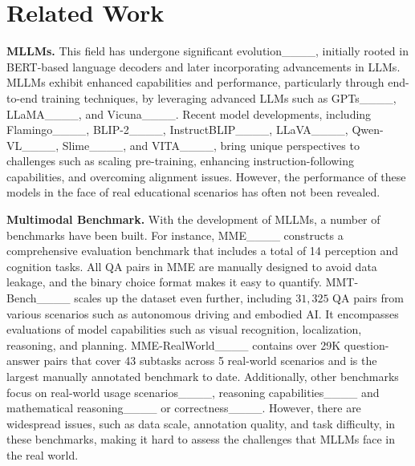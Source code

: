 \section{Related Work}
\textbf{MLLMs.} 
This field has undergone significant evolution____, initially rooted in BERT-based language decoders and later incorporating advancements in LLMs. 
MLLMs exhibit enhanced capabilities and performance, particularly through end-to-end training techniques, by leveraging advanced LLMs such as GPTs____,
LLaMA____,  and Vicuna____. Recent model developments, including Flamingo____, BLIP-2____, InstructBLIP____, LLaVA____, Qwen-VL____, Slime____, and VITA____, bring unique perspectives to challenges such as scaling pre-training, enhancing instruction-following capabilities, and overcoming alignment issues. 
However, the performance of these models in the face of real educational scenarios has often not been revealed.

\textbf{Multimodal Benchmark.} 
With the development of MLLMs, a number of benchmarks have been built.
For instance, MME____ constructs a comprehensive evaluation benchmark that includes a total of 14 perception and cognition tasks. All QA pairs in MME are manually designed to avoid data leakage, and the binary choice format makes it easy to quantify.
MMT-Bench____ scales up the dataset even further, including $31,325$ QA pairs from various scenarios such as autonomous driving and embodied AI. It encompasses evaluations of model capabilities such as visual recognition, localization, reasoning, and planning.
MME-RealWorld____ contains over 29K question-answer pairs that cover 43 subtasks across 5 real-world scenarios and is the largest manually annotated benchmark to date. 
Additionally, other benchmarks focus on real-world usage scenarios____, reasoning capabilities____ and mathematical reasoning____ or correctness____. 
However, there are widespread issues, such as data scale, annotation quality, and task difficulty, in these benchmarks, making it hard to assess the challenges that MLLMs face in the real world.

